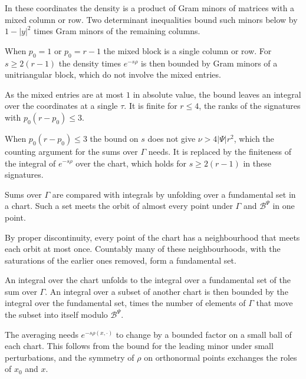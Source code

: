 In these coordinates the density is a product of Gram minors of matrices with a mixed column or row. Two
determinant inequalities bound such minors below by $1-|y|^2$ times Gram minors of the remaining columns.

When $p_0=1$ or $p_0=r-1$ the mixed block is a single column or row. For $s\geq2(r-1)$ the density times
$e^{-s\rho}$ is then bounded by Gram minors of a unitriangular block, which do not involve the mixed entries.

As the mixed entries are at most $1$ in absolute value, the bound leaves an integral over the coordinates at a
single $\tau$. It is finite for $r\le4$, the ranks of the signatures with $p_0(r-p_0)\le3$.

When $p_0(r-p_0)\le3$ the bound on $s$ does not give $\nu>4|\Psi|r^2$, which the counting argument for the
sums over $\Gamma$ needs. It is replaced by the finiteness of the integral of $e^{-s\rho}$ over the chart,
which holds for $s\geq2(r-1)$ in these signatures.

Sums over $\Gamma$ are compared with integrals by unfolding over a fundamental set in a chart. Such a set meets
the orbit of almost every point under $\Gamma$ and $\mathcal B^\Psi$ in one point.

By proper discontinuity, every point of the chart has a neighbourhood that meets each orbit at most once.
Countably many of these neighbourhoods, with the saturations of the earlier ones removed, form a fundamental set.

An integral over the chart unfolds to the integral over a fundamental set of the sum over $\Gamma$. An integral
over a subset of another chart is then bounded by the integral over the fundamental set, times the number of
elements of $\Gamma$ that move the subset into itself modulo $\mathcal B^\Psi$.

The averaging needs $e^{-s\rho(x,\cdot)}$ to change by a bounded factor on a small ball of each chart. This
follows from the bound for the leading minor under small perturbations, and the symmetry of $\rho$ on orthonormal
points exchanges the roles of $x_0$ and $x$.

